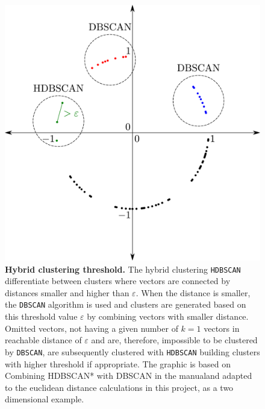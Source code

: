 \begin{figure}[!hbt]
    \centering
    \includegraphics[width=\textwidth]{Graphics/Hybrid.pdf}
    \caption[Hybrid clustering threshold]{\textbf{Hybrid clustering threshold.} The hybrid clustering \texttt{HDBSCAN} differentiate between clusters where vectors are connected by distances smaller and higher than $\varepsilon$. When the distance is smaller, the \texttt{DBSCAN} algorithm is used and clusters are generated based on this threshold value $\varepsilon$ by combining vectors with smaller distance. Omitted vectors, not having a given number of $k=1$ vectors in reachable distance of $\varepsilon$ and are, therefore, impossible to be clustered by \texttt{DBSCAN}, are subsequently clustered with \texttt{HDBSCAN} building clusters with higher threshold if appropriate. The graphic is based on \glqq Combining HDBSCAN* with DBSCAN\grqq{} in the manual\footnotemark and adapted to the euclidean distance calculations in this project, as a two dimensional example.}
    \label{fig:Hybrid}
\end{figure}

